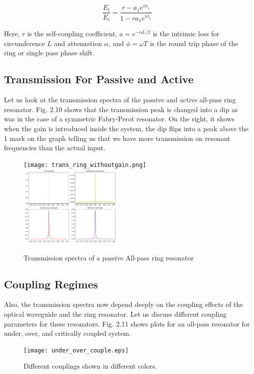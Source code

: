 \begin{equation}
\frac{E_{t}}{E_{i}} = \frac{r - a_{1} e^{i\phi_{1}}}{1 - r a_{1} e^{i\phi_{1}}}
\end{equation}

Here, $r$ is the self-coupling coefficient, $a = e^{-\alpha L/2}$ is the intrinsic loss for circumference $L$ and attenuation $\alpha$, and $\phi = \omega T$ is the round trip phase of the ring or single pass phase shift.

\subsection{Transmission For Passive and Active}
Let us look at the transmission spectra of the passive and active all-pass ring resonator. Fig. 2.10 shows that the transmission peak is changed into a dip as was in the case of a symmetric Fabry-Perot resonator. On the right, it shows when the gain is introduced inside the system, the dip flips into a peak above the 1 mark on the graph telling us that we have more transmission on resonant frequencies than the actual input.
\begin{figure}[h]
\texttt{[image: trans\_ring\_withoutgain.png]}
\includegraphics[width=0.45\textwidth]{all-pall_gain.png}
\caption{Transmission spectra of a passive All-pass ring resonator}
\end{figure}

\subsection{Coupling Regimes}

Also, the transmission spectra now depend deeply on the coupling effects of the optical waveguide and the ring resonator. Let us discuss different coupling parameters for these resonators. Fig. 2.11 shows plots for an all-pass resonator for under, over, and critically coupled system. 

\begin{figure}[h]
\centering
\texttt{[image: under\_over\_couple.eps]}
\caption{Different couplings shown in different colors.}
\end{figure}

